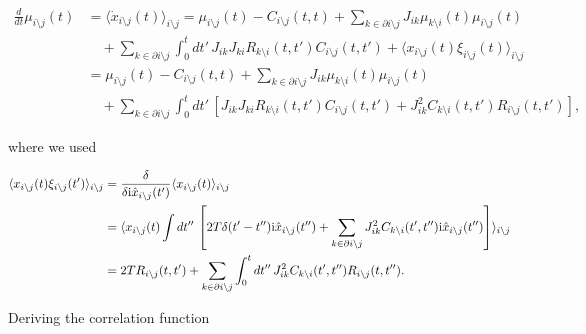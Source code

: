 \documentclass[
    preprint,
    linenumbers,
    amsmath,amssymb,amsfonts,
    aps, physrev,
    superscriptaddress,
    10pt,
    bibnotes
    ]{revtex4-2}
\begin{document}
\begin{subequations}
\begin{align}
\frac{d}{dt}\mu_{i\setminus j}(t) & =\langle\dot{x}_{i\setminus j}(t)\rangle_{i\setminus j}=\mu_{i\setminus j}(t)-C_{i\setminus j}(t,t)+\sum_{k\in\partial i\setminus j}J_{ik}\mu_{k\setminus i}(t)\mu_{i\setminus j}(t)\nonumber \\
 & \quad+\sum_{k\in\partial i\setminus j}\int_{0}^{t}dt'\,J_{ik}J_{ki}R_{k\setminus i}(t,t')C_{i\setminus j}(t,t')+\langle x_{i\setminus j}(t)\xi_{i\setminus j}(t)\rangle_{i\setminus j}\\
 & =\mu_{i\setminus j}(t)-C_{i\setminus j}(t,t)+\sum_{k\in\partial i\setminus j}J_{ik}\mu_{k\setminus i}(t)\mu_{i\setminus j}(t)\nonumber \\
& \quad+\sum_{k\in\partial i\setminus j}\int_{0}^{t}dt'\,\left[J_{ik}J_{ki}R_{k\setminus i}(t,t')C_{i\setminus j}(t,t')+J_{ik}^{2}C_{k\setminus i}(t,t')R_{i\setminus j}(t,t')\right],
\label{eq:righteqformu}
\end{align}
\end{subequations}

where we used

\begin{subequations}
\begin{align}
\langle x_{i\setminus j}(t)\xi_{i\setminus j}(t')\rangle_{i\setminus j} & =\frac{\delta}{\delta{\rm i}\hat{x}_{i\setminus j}(t')}\langle x_{i\setminus j}(t)\rangle_{i\setminus j} \\
 & =\langle x_{i\setminus j}(t)\int dt''\,\left[2T\delta(t'-t''){\rm i}\hat{x}_{i\setminus j}(t'')+\sum_{k\in\partial i\setminus j}J_{ik}^{2}C_{k\setminus i}(t',t''){\rm i}\hat{x}_{i\setminus j}(t'')\right]\rangle_{i\setminus j} \\
 & =2TR_{i\setminus j}(t,t')+\sum_{k\in\partial i\setminus j}\int_{0}^{t}dt''\,J_{ik}^{2}C_{k\setminus i}(t',t'')R_{i\setminus j}(t,t'').
\end{align}
\end{subequations}

Deriving the correlation function
\end{document}
